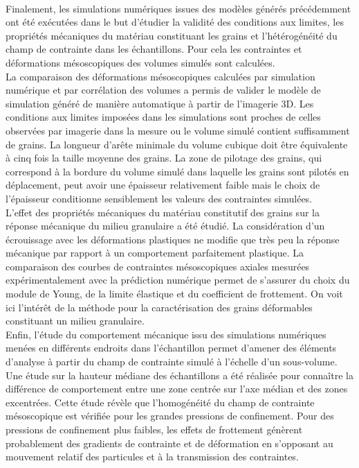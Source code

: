 \paragraph{}
Finalement, les simulations numériques issues des modèles générés précédemment ont été exécutées dans le but d'étudier la validité des conditions aux limites, les propriétés mécaniques du matériau constituant les grains et l'hétérogénéité du champ de contrainte dans les échantillons. Pour cela les contraintes et déformations mésoscopiques des volumes simulés sont calculées.
\\La comparaison des déformations mésoscopiques calculées par simulation numérique et par corrélation des volumes a permis de valider le modèle de simulation généré de manière automatique à partir de l'imagerie 3D. Les conditions aux limites imposées dans les simulations sont proches de celles observées par imagerie dans la mesure ou le volume simulé contient suffisamment de grains. La longueur d'arête minimale du volume cubique doit être équivalente à cinq fois la taille moyenne des grains. La zone de pilotage des grains, qui correspond à la bordure du volume simulé dans laquelle les grains sont pilotés en déplacement, peut avoir une épaisseur relativement faible mais le choix de l'épaisseur conditionne sensiblement les valeurs des contraintes simulées.
\\L'effet des propriétés mécaniques du matériau constitutif des grains sur la réponse mécanique du milieu granulaire a été étudié. La considération d'un écrouissage avec les déformations plastiques ne modifie que très peu la réponse mécanique par rapport à un comportement parfaitement plastique. La comparaison des courbes de contraintes mésoscopiques axiales mesurées expérimentalement avec la prédiction numérique permet de s'assurer du choix du module de Young, de la limite élastique et du coefficient de frottement. On voit ici l'intérêt de la méthode pour la caractérisation des grains déformables constituant un milieu granulaire.
\\Enfin, l'étude du comportement mécanique issu des simulations numériques menées en différents endroits dans l'échantillon permet d'amener des éléments d'analyse à partir du champ de contrainte simulé à l'échelle d'un sous-volume. Une étude sur la hauteur médiane des échantillons a été réalisée pour connaître la différence de comportement entre une zone centrée sur l'axe médian et des zones excentrées. Cette étude révèle que l'homogénéité du champ de contrainte mésoscopique est vérifiée pour les grandes pressions de confinement. Pour des pressions de confinement plus faibles, les effets de frottement génèrent probablement des gradients de contrainte et de déformation en s'opposant au mouvement relatif des particules et à la transmission des contraintes.

